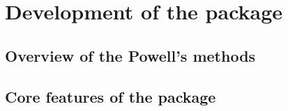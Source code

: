 %
%
%
\chapter{Development of the \texorpdfstring{}{} package}

\section{Overview of the Powell's \texorpdfstring{}{} methods}

\section{Core features of the \texorpdfstring{}{} package}
